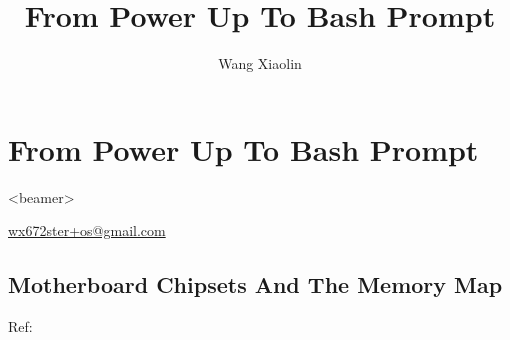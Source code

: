 
\section{From Power Up To Bash Prompt}

\begin{frame}<beamer>
    \title{From Power Up To Bash Prompt}
    \author{Wang Xiaolin}
    \titlepage
    \vfill
    {\small{} \url{wx672ster+os@gmail.com} }
\end{frame}

\subsection{Motherboard Chipsets And The Memory Map}

Ref: 

\begin{frame}
  \begin{center}
  \end{center}
\end{frame}

